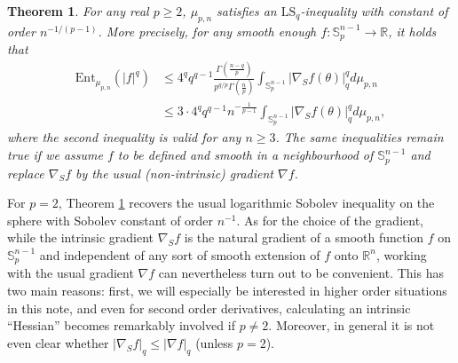 \documentclass[a4paper,12pt]{amsart}
\numberwithin{equation}{section}
\newtheorem{satz}{Theorem}[section]
\theoremstyle{remark}
\def\R{{\mathbb R}}
\def\S{{\mathbb S}}
\begin{document}
\begin{satz}\label{LSICone}
For any real $p \ge 2$, $\mu_{p,n}$ satisfies an $\mathrm{LS}_q$-inequality with constant of order $n^{-1/(p-1)}$. More precisely, for any smooth enough $f \colon \S_p^{n-1} \to \R$, it holds that
\begin{align*}
\mathrm{Ent}_{\mu_{p,n}}(|f|^q) &\le 4^q q^{q-1} \frac {\Gamma(\frac{n-q}{p})}{p^{q/p}\Gamma(\frac n p)} \int_{\S_p^{n-1}} \lvert \nabla_{S} f(\theta) \rvert_q^q d \mu_{p,n}\\
&\le 3 \cdot 4^q q^{q-1} n^{-\frac{1}{p-1}} \int_{\S_p^{n-1}} \lvert \nabla_S f(\theta) \rvert_q^q d \mu_{p,n},
\end{align*}
where the second inequality is valid for any $n \ge 3$. The same inequalities remain true if we assume $f$ to be defined and smooth in a neighbourhood of $\S_p^{n-1}$ and replace $\nabla_S f$ by the usual (non-intrinsic) gradient $\nabla f$.
\end{satz}

For $p=2$, Theorem \ref{LSICone} recovers the usual logarithmic Sobolev inequality on the sphere with Sobolev constant of order $n^{-1}$. As for the choice of the gradient, while the intrinsic gradient $\nabla_S f$ is the natural gradient of a smooth function $f$ on $\S_p^{n-1}$ and independent of any sort of smooth extension of $f$ onto $\R^n$, working with the usual gradient $\nabla f$ can nevertheless turn out to be convenient. This has two main reasons: first, we will especially be interested in higher order situations in this note, and even for second order derivatives, calculating an intrinsic ``Hessian'' becomes remarkably involved if $p \ne 2$. Moreover, in general it is not even clear whether $|\nabla_S f|_q \le |\nabla f|_q$ (unless $p =2$).
\end{document}
